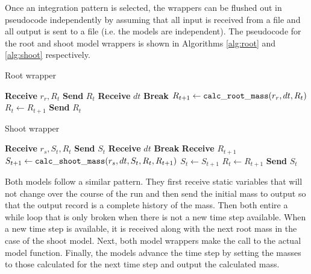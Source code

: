 \documentclass[journal]{IEEEtran}
\begin{document}
Once an integration pattern is selected, the wrappers can be flushed out in pseudocode independently by assuming that all input is received from a file and all output is sent to a file (i.e. the models are independent). The pseudocode for the root and shoot model wrappers is shown in Algorithms \ref{alg:root} and \ref{alg:shoot} respectively.
%
\begin{algorithm}[H]
    \caption{Root wrapper}
    \label{alg:root}
    \begin{algorithmic}[1] 
    \State \textbf{Receive} $r_r, R_t$
    \State \textbf{Send} $R_{t}$ 
        		\State \textbf{Receive} $dt$
	\Else
		\State \textbf{Break}
	\EndIf
    	\State $R_{t+1} \gets {\tt calc\_root\_mass}(r_r, dt, R_t)$
	\State $R_t \gets R_{t+1}$
	\State \textbf{Send} $R_{t}$
    \EndWhile
    \end{algorithmic}
\end{algorithm}
%
\begin{algorithm}[H]
    \caption{Shoot wrapper}
    \label{alg:shoot}
    \begin{algorithmic}[1] 
    \State \textbf{Receive} $r_s, S_t, R_t$
    \State \textbf{Send} $S_{t}$ 
        		\State \textbf{Receive} $dt$
	\Else
		\State \textbf{Break}
	\EndIf
	\State \textbf{Receive} $R_{t+1}$
	\State $S_{t+1} \gets {\tt calc\_shoot\_mass}(r_s, dt, S_t, R_t, R_{t+1})$
	\State $S_t \gets S_{t+1}$
	\State $R_t \gets R_{t+1}$
	\State \textbf{Send} $S_{t}$
    \EndWhile
    \end{algorithmic}
\end{algorithm}
%
Both models follow a similar pattern. They first receive static variables that will not change over the course of the run and then send the initial mass to output so that the output record is a complete history of the mass. Then both entire a while loop that is only broken when there is not a new time step available. When a new time step is available, it is received along with the next root mass in the case of the shoot model. Next, both model wrappers make the call to the actual model function. Finally, the models advance the time step by setting the masses to those calculated for the next time step and output the calculated mass.
\end{document}
